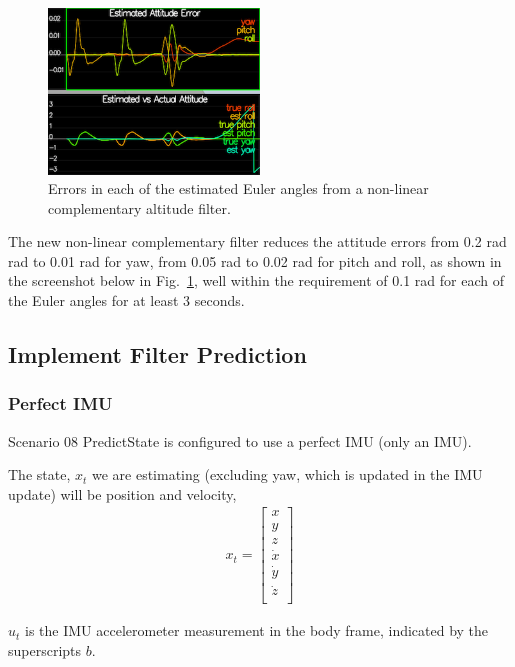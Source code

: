 \documentclass[letterpaper]{article}
\begin{document}
\begin{figure}[ht]
\centering
\includegraphics[width=0.5\textwidth]{./images/scenario7_2.png}
\caption{\label{fig:nonlinear_comp_filter} Errors in each of the estimated Euler angles from a non-linear complementary altitude filter.}
\end{figure}

The new non-linear complementary filter reduces the attitude errors from 0.2 rad rad to 0.01 rad for yaw, from 0.05 rad to 0.02 rad for pitch and roll, as shown in the screenshot below in Fig.~\ref{fig:nonlinear_comp_filter}, well within the requirement of 0.1 rad for each of the Euler angles for at least 3 seconds.

\subsection{Implement Filter Prediction}

\subsubsection{Perfect IMU}

Scenario 08 PredictState is configured to use a perfect IMU (only an IMU). 

The state, $x_t$ we are estimating (excluding yaw, which is updated in the IMU update) will be position and velocity,
\begin{align*}
  x_t = \left[\begin{array}{c} 
      x\\
      y\\
      z\\
      \dot{x}\\
      \dot{y}\\
      \dot{z}\\
      \end{array}\right]
\end{align*}

$u_t$ is the IMU accelerometer measurement in the body frame, indicated by the superscripts $b$. 
\end{document}
